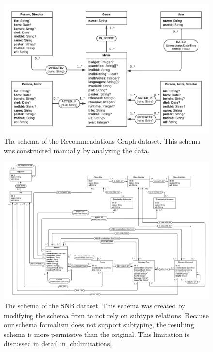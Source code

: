 \documentclass{report}
\theoremstyle{definition}
\begin{document}
\begin{figure}[t]
  \centering
  \includegraphics[width=\textwidth]{figures/schema-recommendations.pdf}
  \caption[The schema of the Recommendations Graph dataset]{The schema of the Recommendations Graph dataset. This schema was constructed manually by analyzing the data.}
  \label{fig:schema-recommendations}
\end{figure}

\begin{figure}[t]
  \centering
  \includegraphics[width=\textwidth]{figures/schema-snb.pdf}
  \caption[The schema of the SNB dataset]{The schema of the SNB dataset. This schema was created by modifying the schema from \citet{angles2020snb} to not rely on subtype relations. Because our schema formalism does not support subtyping, the resulting schema is more permissive than the original. This limitation is discussed in detail in \autoref{ch:limitations}.}
  \label{fig:schema-snb}
\end{figure}
\end{document}
